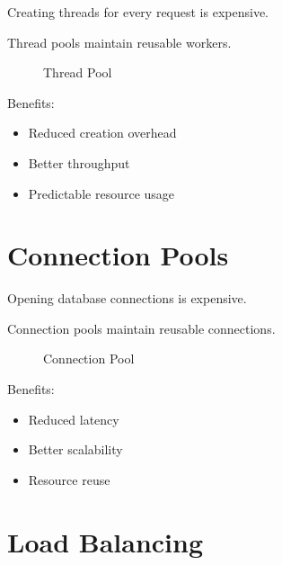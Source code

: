 Creating threads for every request is expensive.

Thread pools maintain reusable workers.

\begin{figure}[H]
\centering
{}
\caption{Thread Pool}
\end{figure}

Benefits:

\begin{itemize}
\item Reduced creation overhead
\item Better throughput
\item Predictable resource usage
\end{itemize}

\section{Connection Pools}

Opening database connections is expensive.

Connection pools maintain reusable connections.

\begin{figure}[H]
\centering
{}
\caption{Connection Pool}
\end{figure}

Benefits:

\begin{itemize}
\item Reduced latency
\item Better scalability
\item Resource reuse
\end{itemize}

\section{Load Balancing}

